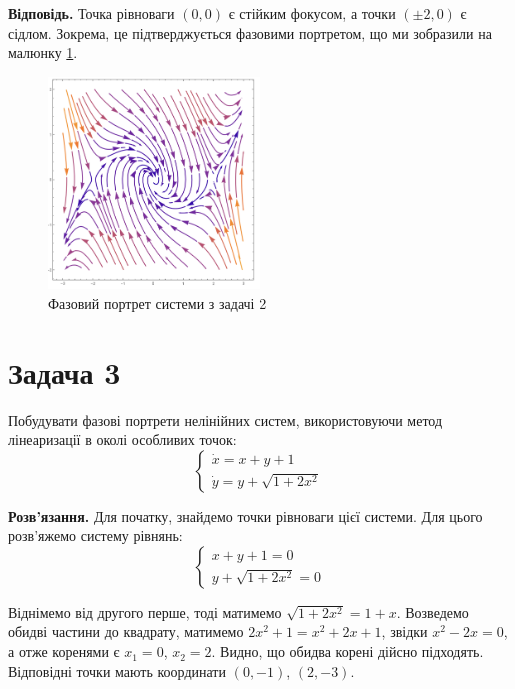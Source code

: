 \documentclass{hw_template}
\begin{document}
\textbf{Відповідь.} Точка рівноваги $(0,0)$ є стійким фокусом, а точки $(\pm
2,0)$ є сідлом. Зокрема, це підтверджується фазовими портретом, що 
ми зобразили на малюнку \ref{fig:phase_portrait}.

\begin{figure}[h!]
    \centering
    \includegraphics[width=0.5\textwidth]{images/test_2_problem_2.png}
    \caption{Фазовий портрет системи з задачі 2}
    \label{fig:phase_portrait}
\end{figure}

\newpage

\section{Задача 3}

\begin{problem}
    Побудувати фазові портрети нелінійних систем, використовуючи 
    метод лінеаризації в околі особливих точок:
    \begin{equation*}
        \begin{cases}
            \dot{x} = x+y+1 \\
            \dot{y} = y + \sqrt{1+2x^2}
        \end{cases}
    \end{equation*}
\end{problem}

\textbf{Розв'язання.} Для початку, знайдемо точки рівноваги цієї системи.
Для цього розв'яжемо систему рівнянь:
\begin{equation*}
    \begin{cases}
        x+y+1 = 0 \\
        y + \sqrt{1+2x^2} = 0
    \end{cases}
\end{equation*}

Віднімемо від другого перше, тоді матимемо $\sqrt{1+2x^2} = 1+x$. Возведемо
обидві частини до квадрату, матимемо $2x^2+1=x^2+2x+1$, звідки $x^2-2x=0$, а
отже коренями є $x_1=0$, $x_2=2$. Видно, що обидва корені дійсно підходять.
Відповідні точки мають координати $(0,-1)$, $(2,-3)$.
\end{document}
